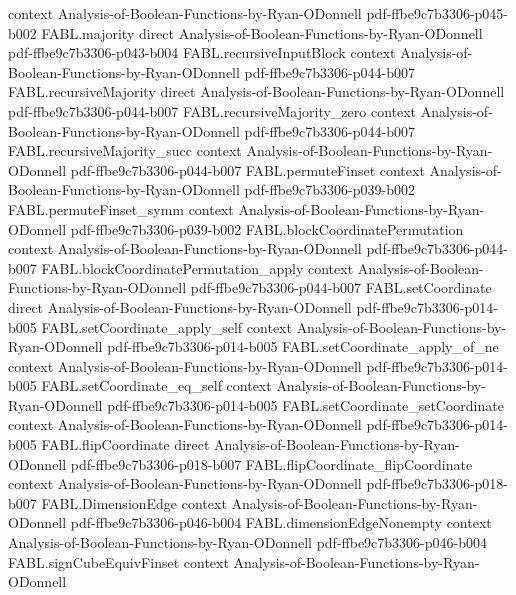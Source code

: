 \begin{theorem}
  {context}
  {Analysis-of-Boolean-Functions-by-Ryan-ODonnell}
  {pdf-ffbe9c7b3306-p045-b002}
\proofstep
  {FABL.majority}
  {direct}
  {Analysis-of-Boolean-Functions-by-Ryan-ODonnell}
  {pdf-ffbe9c7b3306-p043-b004}
\proofstep
  {FABL.recursiveInputBlock}
  {context}
  {Analysis-of-Boolean-Functions-by-Ryan-ODonnell}
  {pdf-ffbe9c7b3306-p044-b007}
\proofstep
  {FABL.recursiveMajority}
  {direct}
  {Analysis-of-Boolean-Functions-by-Ryan-ODonnell}
  {pdf-ffbe9c7b3306-p044-b007}
\proofstep
  {FABL.recursiveMajority_zero}
  {context}
  {Analysis-of-Boolean-Functions-by-Ryan-ODonnell}
  {pdf-ffbe9c7b3306-p044-b007}
\proofstep
  {FABL.recursiveMajority_succ}
  {context}
  {Analysis-of-Boolean-Functions-by-Ryan-ODonnell}
  {pdf-ffbe9c7b3306-p044-b007}
\proofstep
  {FABL.permuteFinset}
  {context}
  {Analysis-of-Boolean-Functions-by-Ryan-ODonnell}
  {pdf-ffbe9c7b3306-p039-b002}
\proofstep
  {FABL.permuteFinset_symm}
  {context}
  {Analysis-of-Boolean-Functions-by-Ryan-ODonnell}
  {pdf-ffbe9c7b3306-p039-b002}
\proofstep
  {FABL.blockCoordinatePermutation}
  {context}
  {Analysis-of-Boolean-Functions-by-Ryan-ODonnell}
  {pdf-ffbe9c7b3306-p044-b007}
\proofstep
  {FABL.blockCoordinatePermutation_apply}
  {context}
  {Analysis-of-Boolean-Functions-by-Ryan-ODonnell}
  {pdf-ffbe9c7b3306-p044-b007}
\proofstep
  {FABL.setCoordinate}
  {direct}
  {Analysis-of-Boolean-Functions-by-Ryan-ODonnell}
  {pdf-ffbe9c7b3306-p014-b005}
\proofstep
  {FABL.setCoordinate_apply_self}
  {context}
  {Analysis-of-Boolean-Functions-by-Ryan-ODonnell}
  {pdf-ffbe9c7b3306-p014-b005}
\proofstep
  {FABL.setCoordinate_apply_of_ne}
  {context}
  {Analysis-of-Boolean-Functions-by-Ryan-ODonnell}
  {pdf-ffbe9c7b3306-p014-b005}
\proofstep
  {FABL.setCoordinate_eq_self}
  {context}
  {Analysis-of-Boolean-Functions-by-Ryan-ODonnell}
  {pdf-ffbe9c7b3306-p014-b005}
\proofstep
  {FABL.setCoordinate_setCoordinate}
  {context}
  {Analysis-of-Boolean-Functions-by-Ryan-ODonnell}
  {pdf-ffbe9c7b3306-p014-b005}
\proofstep
  {FABL.flipCoordinate}
  {direct}
  {Analysis-of-Boolean-Functions-by-Ryan-ODonnell}
  {pdf-ffbe9c7b3306-p018-b007}
\proofstep
  {FABL.flipCoordinate_flipCoordinate}
  {context}
  {Analysis-of-Boolean-Functions-by-Ryan-ODonnell}
  {pdf-ffbe9c7b3306-p018-b007}
\proofstep
  {FABL.DimensionEdge}
  {context}
  {Analysis-of-Boolean-Functions-by-Ryan-ODonnell}
  {pdf-ffbe9c7b3306-p046-b004}
\proofstep
  {FABL.dimensionEdgeNonempty}
  {context}
  {Analysis-of-Boolean-Functions-by-Ryan-ODonnell}
  {pdf-ffbe9c7b3306-p046-b004}
\proofstep
  {FABL.signCubeEquivFinset}
  {context}
  {Analysis-of-Boolean-Functions-by-Ryan-ODonnell}

\end{theorem}
